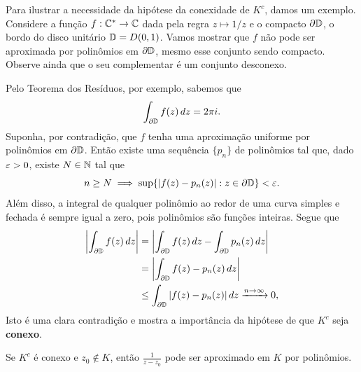     Para ilustrar a necessidade da hipótese da conexidade de $K^c$, damos um exemplo. 
    Considere a função $f: \mathbb{C}^* \to \mathbb{C}$ dada pela regra $z \mapsto 1/z$ e o compacto 
    $\partial \mathbb{D}$, o bordo do disco unitário  $\mathbb{D}=D(0,1)$. Vamos mostrar que $f$ não
    pode ser aproximada por polinômios em $\partial\mathbb{D}$, mesmo esse conjunto sendo compacto.
    Observe ainda que o seu complementar é um conjunto desconexo.
    
    Pelo Teorema dos Resíduos, por exemplo, sabemos que
    \begin{equation*}
        \int_{\partial \mathbb{D}}f(z) \, dz = 2 \pi i.
    \end{equation*}
    Suponha, por contradição, que $f$ tenha uma aproximação uniforme por polinômios em 
    $\partial \mathbb{D}$. Então existe uma sequência $\{p_n\}$ de polinômios tal que, 
    dado $\varepsilon > 0$, existe $N \in \mathbb{N}$ tal que
    \begin{equation*}
        n \geq N \implies \sup \{|f(z) - p_n(z)|: z \in \partial \mathbb{D}\} < \varepsilon.
    \end{equation*}
    Além disso, a integral de qualquer polinômio ao redor de uma curva simples e fechada é sempre
    igual a zero, pois polinômios são funções inteiras. Segue que
    \begin{align*}
        \left|\int_{\partial \mathbb{D}} f(z) \, dz\right| 
        &= \left|\int_{\partial \mathbb{D}} f(z) \, dz - \int_{\partial \mathbb{D}} p_n(z) \, dz\right| \\
        &= \left|\int_{\partial \mathbb{D}} f(z) - p_n(z)\, dz\right| \\
        &\leq \int_{\partial \mathbb{D}}|f(z) - p_n(z)| \, dz \xrightarrow{n\to\infty} 0,
    \end{align*}
    Isto é uma clara contradição e mostra a importância da hipótese de que $K^c$ seja {\bf conexo}.
    \begin{lema}
    \label{LR3}
        Se $K^c$ é conexo e $z_0 \not \in K$, então $\displaystyle{\frac{1}{z-z_0}}$ 
        pode ser aproximado em $K$ por polinômios.
    \end{lema}
